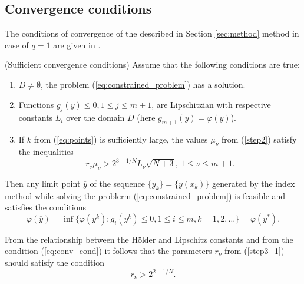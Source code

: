\documentclass[runningheads]{llncs}
\begin{document}
\subsection{Convergence conditions }
\label{sec:conv_method}

The conditions of convergence of the described in Section \ref{sec:method} method in case of \(q=1\) are given in \cite{Strongin2000}.
\begin{theorem} (Sufficient convergence conditions)
  \label{th:single_conv}
  Assume that the following conditions are true:
  \begin{enumerate}
    \item \(D\ne\emptyset\), the problem (\ref{eq:constrained_problem}) has a solution.
    \item Functions \(g_j(y)\leqslant 0, 1\leqslant j\leqslant m + 1\), are Lipschitzian with
respective constants \(L_i\) over the domain \(D\) (here \(g_{m+1}(y)=\varphi(y)\)).
    \item If \(k\) from (\ref{eq:points}) is sufficiently large,
    the values \(\mu_\nu\) from (\ref{step2}) satisfy the inequalities
    \begin{equation}
      r_\nu\mu_\nu > 2^{3-1/N}L_\nu \sqrt{N+3},\: 1\leqslant \nu \leqslant m + 1.
    \end{equation}
  \end{enumerate}
  Then any limit point \(\overline{y}\) of the sequence \(\{y_k\} = \{y(x_k)\}\) generated
  by the index method while solving the problerm
  (\ref{eq:constrained_problem}) is feasible and satisfies the conditions
\begin{equation}
  \label{eq:conv_cond}
  \varphi(\overline{y})=\inf\{ \varphi(y^k): g_i(y^k)\leqslant 0,1\leqslant i\leqslant m, k=1,2,\dots\}=\varphi(y^*).
\end{equation}
\end{theorem}

\begin{remark}
  \label{rem:r1}
  From the relationship between the H\"{o}lder and Lipschitz constants and from the condition (\ref{eq:conv_cond}) it follows
  that the parameters \(r_\nu\) from (\ref{step3_1}) should satisfy the condition
  \begin{equation}
    r_\nu > 2^{2 - 1/N}.
  \end{equation}
\end{remark}
\end{document}

